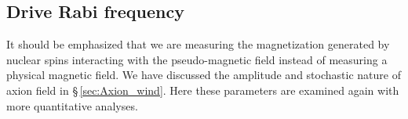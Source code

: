 
\subsection{Drive Rabi frequency}

It should be emphasized that we are measuring the magnetization generated by nuclear spins interacting with the pseudo-magnetic field instead of measuring a physical magnetic field. %
We have discussed the amplitude and stochastic nature of axion field in \S\,\ref{sec:Axion_wind}. Here these parameters are examined again with more quantitative analyses.

